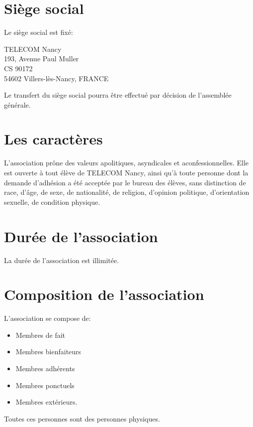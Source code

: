 \documentclass{article}
\begin{document}
	\section{Siège social}
\label{sec:siege_social}
		Le siège social est fixé:
		\begin{center}
			TELECOM Nancy\\
			193, Avenue Paul Muller\\
			CS 90172\\
			54602 Villers-lès-Nancy, FRANCE
		\end{center}

		Le transfert du siège social pourra être effectué par décision de
		l’assemblée générale.

	\section{Les caractères}
\label{sec:les_caracteres}
		L’association prône des valeurs apolitiques, asyndicales et
		aconfessionnelles. Elle est ouverte à tout élève de TELECOM Nancy, ainsi
		qu’à toute personne dont la demande d’adhésion a été acceptée par le
		bureau des élèves, sans distinction de race, d'âge, de sexe, de
		nationalité, de religion, d’opinion politique, d’orientation sexuelle,
		de condition physique.

	\section{Durée de l’association}
\label{sec:duree_de_l_association}
		La durée de l’association est illimitée.

	\section{Composition de l'association}
\label{sec:composition_de_l_association}
	
		L’association se compose de:
		\begin{itemize}
			\item Membres de fait
			\item Membres bienfaiteurs
			\item Membres adhérents
			\item Membres ponctuels %
			\item Membres extérieurs.
		\end{itemize}
	
		Toutes ces personnes sont des personnes physiques.
\end{document}
